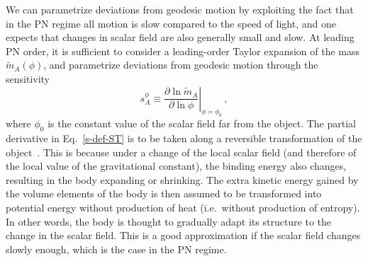 \documentclass[prd,aps,twocolumn,nofootinbib,showpacs,superscriptaddress]{revtex4-1}
\newcommand\be{\begin{equation}}
\newcommand\ee{\end{equation}}
\begin{document}
We can parametrize deviations from geodesic motion by exploiting the fact that 
in the PN regime all motion is slow compared to the speed of light, and one expects that changes 
in scalar field are also generally small and slow. At leading PN order, 
it is sufficient to consider a leading-order Taylor expansion of the mass $\tilde{m}_A(\phi)$,
and parametrize deviations from geodesic motion through the sensitivity~\cite{eardley} 
\be
s^\phi_{A} \equiv \left.\frac{\partial \ln \tilde{m}_{A}}{\partial \ln \phi} \right|_{\phi=\phi_{0}}\,,
\label{s-def-ST}
\ee
where $\phi_{0}$ is the constant value of the scalar field far from the object.
The partial derivative in Eq.~\eqref{s-def-ST} is to be taken along
a reversible transformation of the object~\cite{eardley}. This is because
under a change of the local scalar field (and therefore of the local value of the gravitational constant), the binding energy also changes, resulting in the body expanding or shrinking. The extra
kinetic energy gained by the volume elements of the body is then
assumed to be transformed into potential energy 
without production of heat (i.e.~without production of entropy). In other words, the
body is thought to gradually adapt its structure to the change in the
scalar field. This is a good approximation if the scalar field
changes slowly enough, which is the case in the PN regime. 
\end{document}
